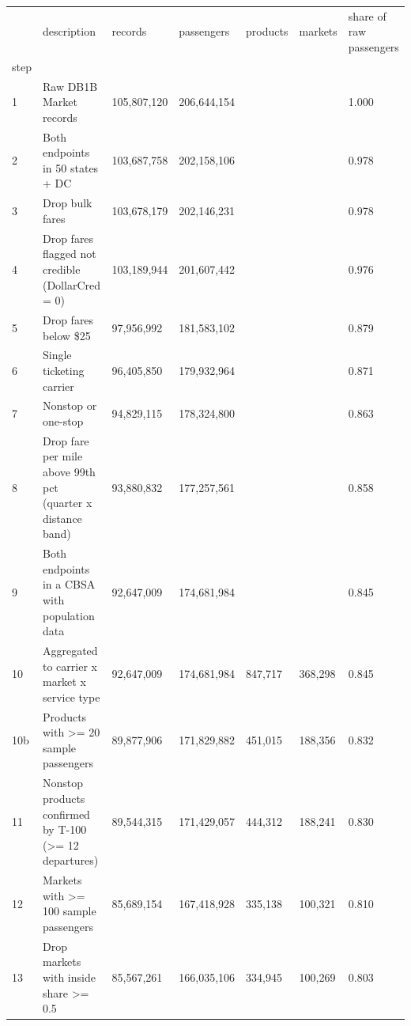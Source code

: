 \begin{tabular}{lllllll}
\toprule
 & description & records & passengers & products & markets & share of raw passengers \\
step &  &  &  &  &  &  \\
\midrule
1 & Raw DB1B Market records & 105,807,120 & 206,644,154 &  &  & 1.000 \\
2 & Both endpoints in 50 states + DC & 103,687,758 & 202,158,106 &  &  & 0.978 \\
3 & Drop bulk fares & 103,678,179 & 202,146,231 &  &  & 0.978 \\
4 & Drop fares flagged not credible (DollarCred = 0) & 103,189,944 & 201,607,442 &  &  & 0.976 \\
5 & Drop fares below \$25 & 97,956,992 & 181,583,102 &  &  & 0.879 \\
6 & Single ticketing carrier & 96,405,850 & 179,932,964 &  &  & 0.871 \\
7 & Nonstop or one-stop & 94,829,115 & 178,324,800 &  &  & 0.863 \\
8 & Drop fare per mile above 99th pct (quarter x distance band) & 93,880,832 & 177,257,561 &  &  & 0.858 \\
9 & Both endpoints in a CBSA with population data & 92,647,009 & 174,681,984 &  &  & 0.845 \\
10 & Aggregated to carrier x market x service type & 92,647,009 & 174,681,984 & 847,717 & 368,298 & 0.845 \\
10b & Products with >= 20 sample passengers & 89,877,906 & 171,829,882 & 451,015 & 188,356 & 0.832 \\
11 & Nonstop products confirmed by T-100 (>= 12 departures) & 89,544,315 & 171,429,057 & 444,312 & 188,241 & 0.830 \\
12 & Markets with >= 100 sample passengers & 85,689,154 & 167,418,928 & 335,138 & 100,321 & 0.810 \\
13 & Drop markets with inside share >= 0.5 & 85,567,261 & 166,035,106 & 334,945 & 100,269 & 0.803 \\
\bottomrule
\end{tabular}
\par\vspace{2pt}{\footnotesize DB1B Market 10\% sample, 2022Q1--2025Q2. Records and passengers are DB1B sample counts. Steps 10--13 refer to the baseline non-directional airport-pair dataset.}

